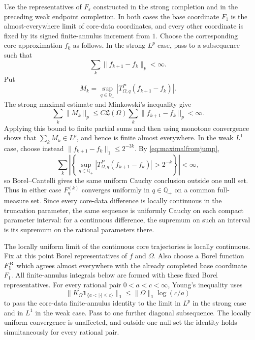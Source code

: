 \documentclass[11pt]{article}
\numberwithin{equation}{section}
\theoremstyle{remark}
\theoremstyle{definition}
\newcommand{\norm}[1]{\lVert #1\rVert}
\begin{document}
Use the representatives of $F_\varepsilon$ constructed in the strong
completion and in the preceding weak endpoint completion.  In both cases
the base coordinate $F_1$ is the almost-everywhere limit of core-data
coordinates, and every other coordinate is fixed by its signed
finite-annulus increment from $1$.  Choose the corresponding core
approximation $f_k$ as follows.  In the strong $L^p$ case, pass to a
subsequence such that
\[
 \sum_k\norm{f_{k+1}-f_k}_p<\infty.
\]
Put
\[
 M_k=\sup_{q\in\mathbb Q_+}
 |T^P_{\Omega,q}(f_{k+1}-f_k)|.
\]
The strong maximal estimate and Minkowski's inequality give
\[
 \sum_k\norm{M_k}_p
 \le C\mathfrak L(\Omega)
      \sum_k\norm{f_{k+1}-f_k}_p<\infty.
\]
Applying this bound to finite partial sums and then using monotone
convergence shows that $\sum_kM_k\in L^p$, and hence is finite almost
everywhere.  In the weak $L^1$ case, choose instead
$\norm{f_{k+1}-f_k}_1\le2^{-3k}$.  By
\eqref{eq:maximalfromjump},
\[
 \sum_k\left|\left\{
  \sup_{q\in\mathbb Q_+}
  |T^P_{\Omega,q}(f_{k+1}-f_k)|>2^{-k}
 \right\}\right|<\infty,
\]
so Borel--Cantelli gives the same uniform Cauchy conclusion outside one
null set.  Thus in either case $F^{(k)}_q$ converges uniformly in
$q\in\mathbb Q_+$ on a common full-measure set.  Since every core-data
difference is locally continuous in the truncation parameter, the same
sequence is uniformly Cauchy on each compact parameter interval: for a
continuous difference, the supremum on such an interval is its supremum
on the rational parameters there.

The locally uniform limit of the continuous core trajectories is locally
continuous.  Fix at this point Borel representatives of $f$ and
$\Omega$.  Also choose a Borel function $F_1^{\rm B}$ which agrees
almost everywhere with the already completed base coordinate $F_1$.
All finite-annulus integrals below are formed with these fixed Borel
representatives.  For every rational pair $0<a<c<\infty$, Young's
inequality uses
\begin{equation}\label{eq:finite-annulus-L1}
 \norm{K_\Omega\mathbf1_{\{a<|\cdot|\le c\}}}_1
 \le\norm\Omega_1\log(c/a)
\end{equation}
to pass the core-data finite-annulus identity to the limit in $L^p$ in
the strong case and in $L^1$ in the weak case.  Pass to one further
diagonal subsequence.  The locally uniform convergence is unaffected, and
outside one null set the identity holds simultaneously for every rational
pair.
\end{document}
